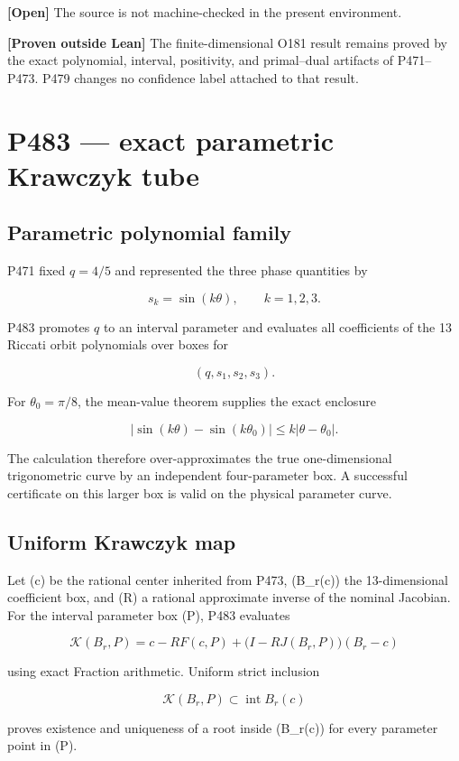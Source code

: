 \documentclass[11pt,a4paper,openany]{report}
\begin{document}
\textbf{\textcolor{finorange}{[Open]}} The source is not machine-checked in the present environment.

\textbf{[Proven outside Lean]} The finite-dimensional O181 result remains proved by the exact polynomial, interval, positivity, and primal--dual artifacts of P471--P473. P479 changes no confidence label attached to that result.

\chapter{P483 --- exact parametric Krawczyk tube}

\section{Parametric polynomial family}

P471 fixed \(q=4/5\) and represented the three phase quantities by

\[
s_k=\sin(k\theta),\qquad k=1,2,3.
\]

P483 promotes \(q\) to an interval parameter and evaluates all coefficients of the 13 Riccati orbit polynomials over boxes for

\[
(q,s_1,s_2,s_3).
\]

For \(\theta_0=\pi/8\), the mean-value theorem supplies the exact enclosure

\[
|\sin(k\theta)-\sin(k\theta_0)|
\le k|\theta-\theta_0|.
\]

The calculation therefore over-approximates the true one-dimensional trigonometric curve by an independent four-parameter box. A successful certificate on this larger box is valid on the physical parameter curve.

\section{Uniform Krawczyk map}

Let (c) be the rational center inherited from P473, (B\_r(c)) the 13-dimensional coefficient box, and (R) a rational approximate inverse of the nominal Jacobian. For the interval parameter box (P), P483 evaluates

\[
\mathcal K(B_r,P)=
c-RF(c,P)+\bigl(I-RJ(B_r,P)\bigr)(B_r-c)
\]

using exact Fraction arithmetic. Uniform strict inclusion

\[
\mathcal K(B_r,P)\subset\operatorname{int}B_r(c)
\]

proves existence and uniqueness of a root inside (B\_r(c)) for every parameter point in (P).
\end{document}
